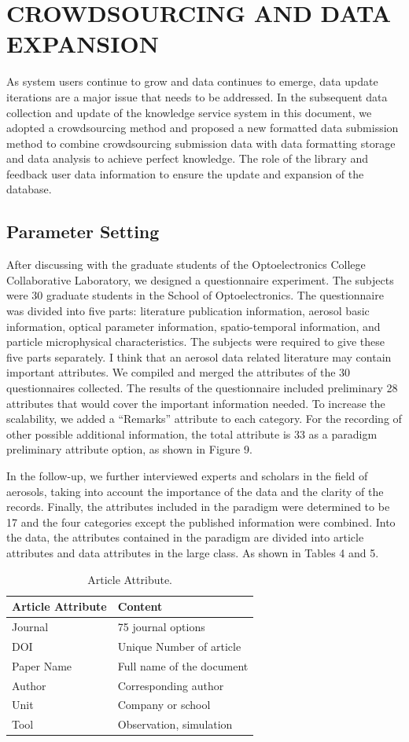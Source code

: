 \section{CROWDSOURCING AND DATA EXPANSION}
As system users continue to grow and data continues to emerge, data update iterations are a major issue that needs to be addressed. In the subsequent data collection and update of the knowledge service system in this document, we adopted a crowdsourcing method and proposed a new formatted data submission method to combine crowdsourcing submission data with data formatting storage and data analysis to achieve perfect knowledge. The role of the library and feedback user data information to ensure the update and expansion of the database.

\subsection{Parameter Setting}
After discussing with the graduate students of the Optoelectronics College Collaborative Laboratory, we designed a questionnaire experiment. The subjects were 30 graduate students in the School of Optoelectronics. The questionnaire was divided into five parts: literature publication information, aerosol basic information, optical parameter information, spatio-temporal information, and particle microphysical characteristics. The subjects were required to give these five parts separately. I think that an aerosol data related literature may contain important attributes. We compiled and merged the attributes of the 30 questionnaires collected. The results of the questionnaire included preliminary 28 attributes that would cover the important information needed. To increase the scalability, we added a “Remarks” attribute to each category. For the recording of other possible additional information, the total attribute is 33 as a paradigm preliminary attribute option, as shown in Figure 9.

In the follow-up, we further interviewed experts and scholars in the field of aerosols, taking into account the importance of the data and the clarity of the records. Finally, the attributes included in the paradigm were determined to be 17 and the four categories except the published information were combined. Into the data, the attributes contained in the paradigm are divided into article attributes and data attributes in the large class. As shown in Tables 4 and 5.

\begin{table}
	\caption{Article Attribute.}
	\label{tab:freq}
	\begin{tabular}{ll}
		\toprule
		Article Attribute&Content\\
		\midrule
		Journal & 75 journal options\\
		DOI & Unique Number of article\\
		Paper Name & Full name of the document\\
		Author & Corresponding author\\
		Unit & Company or school\\
		Tool & Observation, simulation\\
		\bottomrule
	\end{tabular}
\end{table}

